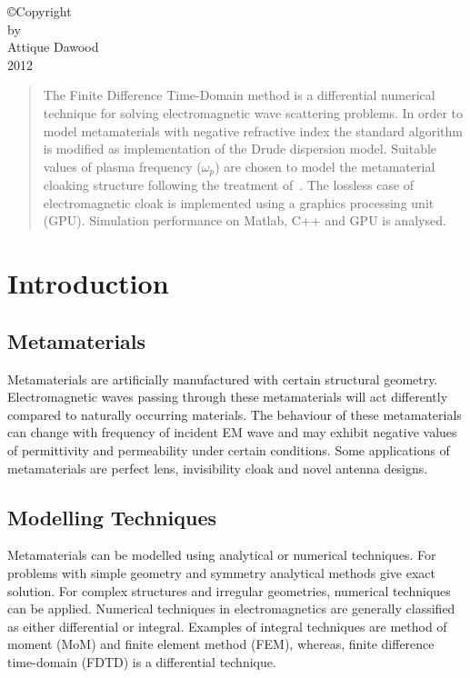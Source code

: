\documentclass[10pt,A4paper]{report}
\begin{document}



\begin{center}
\copyright Copyright\\[0.2in]
by\\[0.2in]
Attique Dawood\\[0.2in]
2012
\end{center}



\tableofcontents
{}	%
\listoffigures

\begin{abstract}
The Finite Difference Time-Domain method is a differential numerical technique for solving electromagnetic wave scattering problems. In order to model metamaterials with negative refractive index the standard algorithm is modified as implementation of the Drude dispersion model. Suitable values of plasma frequency ($\omega_p$) are chosen to model the metamaterial cloaking structure following the treatment of~\cite{Radial-Zhao}. The lossless case of electromagnetic cloak is implemented using a graphics processing unit (GPU). Simulation performance on Matlab, C++ and GPU is analysed.
\end{abstract}


\chapter{Introduction}
\section{Metamaterials}
Metamaterials are artificially manufactured with certain structural geometry. Electromagnetic waves passing through these metamaterials will act differently compared to naturally occurring materials. The behaviour of these metamaterials can change with frequency of incident EM wave and may exhibit negative values of permittivity and permeability under certain conditions. Some applications of metamaterials are perfect lens, invisibility cloak and novel antenna designs.

\section{Modelling Techniques}
Metamaterials can be modelled using analytical or numerical techniques. For problems with simple geometry and symmetry analytical methods give exact solution. For complex structures and irregular geometries, numerical techniques can be applied. Numerical techniques in electromagnetics are generally classified as either differential or integral. Examples of integral techniques are method of moment (MoM) and finite element method (FEM), whereas, finite difference time-domain (FDTD) is a differential technique.
\end{document}
